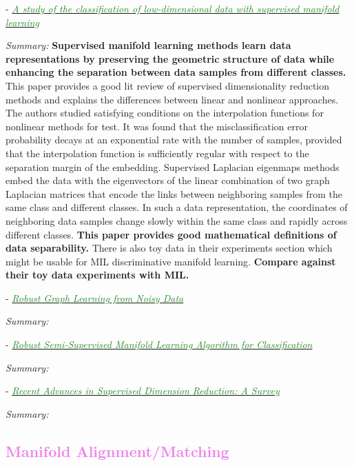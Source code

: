 \documentclass[]{article}
\newcommand{\paperentry}[4]{
            \hangindent=1cm
            \textcolor{red}{\cite{#1}} - \href{run:../References/#3}{\textcolor{ForestGreen}{\textit{#2}}}
            
            \noindent            
            \begin{minipage}[t]{0.1\linewidth}\hfill\end{minipage}
            \begin{minipage}[t]{0.8\linewidth}\textcolor{NavyBlue}{{\textit{Summary:}}}#4\end{minipage}
            \vspace{.25cm}
          }
\begin{document}
	\paperentry{Vural2018StudySupervisedManifoldLearning}
	{A study of the classification of low-dimensional data with supervised manifold learning}
	{Manifold_Representation_Learning/Supervised/Vural2018StudySupervisedManifoldLearning.pdf}
	{ \textbf{Supervised manifold learning methods learn data representations by preserving the geometric structure of data while enhancing the separation between data samples from different classes.}  This paper provides a good lit review of supervised dimensionality reduction methods and explains the differences between linear and nonlinear approaches.  The authors studied satisfying conditions on the interpolation functions for nonlinear methods for test. It was found that the misclassification error probability decays at an exponential rate with the number of samples, provided that the interpolation function is sufficiently regular with respect to the separation margin of the embedding. \newline Supervised Laplacian eigenmaps methods embed the data with the eigenvectors of the linear combination of two graph Laplacian matrices that encode the links between neighboring samples from the same class and different classes.  In such a data representation, the coordinates of neighboring data samples change slowly within the same class and rapidly across different classes. \newline \textbf{This paper provides good mathematical definitions of data separability.}  There is also toy data in their experiments section which might be usable for MIL discriminative manifold learning. \textbf{Compare against their toy data experiments with MIL.}}
	
	
	\paperentry{Kang2018ManifoldRegularizedPCA}
	{Robust Graph Learning from Noisy Data}
	{Manifold_Representation_Learning/Supervised/Kang2018ManifoldRegularizedPCA.pdf}
	{}
	

	\paperentry{Chen2018RobustSemiSupManifoldLearning}
	{Robust Semi-Supervised Manifold Learning Algorithm for Classification}
	{Manifold_Representation_Learning/Supervised/Chen2018RobustSemiSupManifoldLearning.pdf}
	{}
	
	\paperentry{Chao2019RecentAdvancesSupervisedDimRed}
	{Recent Advances in Supervised Dimension Reduction: A Survey}
	{Manifold_Representation_Learning/Supervised/Chao2019RecentAdvancesSupervisedDimRed.pdf}
	{}
	
	
	\textcolor{Violet}{\subsection{Manifold Alignment/Matching}}
	
\end{document}
